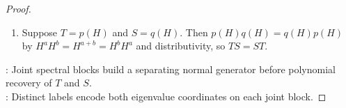 \begin{corollary}
\begin{proof}
\begin{enumerate}[label=\roman*.]
\begin{enumerate}[label=(\alph*)]
Then $H$ is normal, with $\operatorname{spec}(H)=\{\alpha_{\lambda,\mu}:(\lambda,\mu)\in\mathcal{I}\}$, by Theorem \ref{thm:spectral-resolution-normal-operator}(i)--(ii).
\item {}: Each $P_{\lambda}$ is a polynomial in $T$ and each $Q_{\mu}$ is a polynomial in $S$ by Corollary \ref{cor:normal-spectral-resolution-functional-calculus}(ii).\\
Therefore $H$ is a finite sum of terms $c_{a,b}T^aS^b$, so $H\in\mathbb{C}[T,S]$.
\item {}: Define $f,g:\operatorname{spec}(H)\to\mathbb{C}$ by $f(\alpha_{\lambda,\mu})\defeq\lambda$ and $g(\alpha_{\lambda,\mu})\defeq\mu$.\\
Fix $p,q\in\mathbb{C}[z]$ satisfying $p|_{\operatorname{spec}(H)}=f$ and $q|_{\operatorname{spec}(H)}=g$ by Theorem \ref{thm:finite-spectral-functional-calculus-normal}(ii).\\
Then $p(H)=\sum\limits_{(\lambda,\mu)\in\mathcal{I}}\lambda P_{\lambda}Q_{\mu}=T$ by the spectral resolution of $T$.\\
The identity $q(H)=\sum\limits_{(\lambda,\mu)\in\mathcal{I}}\mu P_{\lambda}Q_{\mu}=S$ holds by the spectral resolution of $S$.
\end{enumerate}
\item[$(\Leftarrow)$] Suppose $T=p(H)$ and $S=q(H)$. Then $p(H)q(H)=q(H)p(H)$ by $H^aH^b=H^{a+b}=H^bH^a$ and distributivity, so $TS=ST$.
\end{enumerate}
: Joint spectral blocks build a separating normal generator before polynomial recovery of $T$ and $S$.\\
: Distinct labels encode both eigenvalue coordinates on each joint block.
\end{proof}
\end{corollary}

